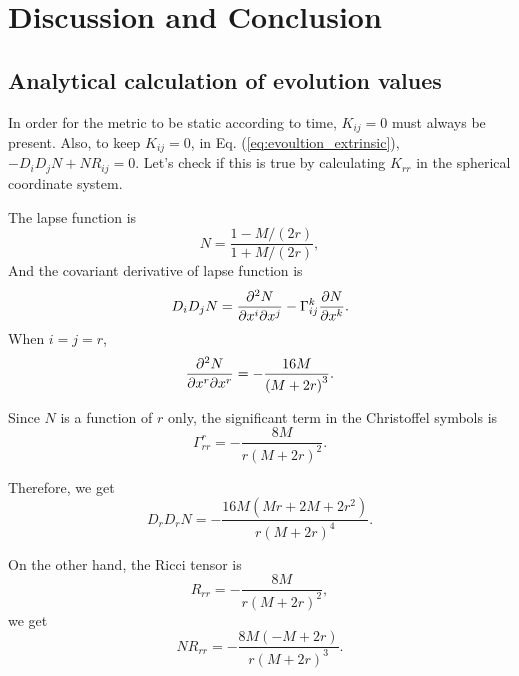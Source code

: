 
\chapter{Discussion and Conclusion} %

\label{Chapter4} %


\section{Analytical calculation of evolution values}

In order for the metric to be static according to time, $K_{ij}=0$ must always be present. Also, to keep $K_{ij} = 0$, in Eq. (\ref{eq:evoultion_extrinsic}), $-D_i D_j N + NR_{ij} = 0$. Let's check if this is true by calculating $K_{rr}$ in the spherical coordinate system.

The lapse function is 
\begin{equation}
	N = \frac{1 - M/(2r)}{1+M/(2r)},
\end{equation}
And the covariant derivative of lapse function is
\begin{equation}
	D_i D_j N = \pdv{N}{x^i}{x^j} - \Gamma^k_{ij}\pdv{N}{x^k}.
\end{equation}
When $i=j=r$,
\begin{equation}
	\pdv{N}{x^r}{x^r} = - \frac{16 M}{\left(M + 2 r\right)^{3}}.
\end{equation}

Since $N$ is a function of $r$ only, the significant term in the Christoffel symbols is
\begin{equation}
	\Gamma^r_{rr} = - \frac{8 M}{r \left(M + 2 r\right)^{2}}.
\end{equation}

Therefore, we get
\begin{equation}
	D_rD_rN = - \frac{16 M \left(M r + 2 M + 2 r^{2}\right)}{r \left(M + 2 r\right)^{4}}.
\end{equation}

On the other hand, the Ricci tensor is
\begin{equation}
	R_{rr} = - \frac{8 M}{r \left(M + 2 r\right)^{2}},
\end{equation}
we get
\begin{equation}
	NR_{rr} = - \frac{8 M \left(- M + 2 r\right)}{r \left(M + 2 r\right)^{3}}.
\end{equation}

